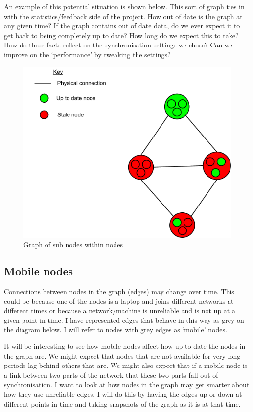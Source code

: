 \documentclass[12pt]{article}
\begin{document}
An example of this potential situation is shown below.
This sort of graph ties in with the statistics/feedback side of the
project. How out of date is the graph at any given time?
If the graph contains out of date data, do we ever expect it
to get back  to being completely up to date? How long do we expect
this to take? How do these facts reflect on the synchronisation settings
we chose? Can we improve on the ‘performance’ by tweaking the settings?

\begin{figure}[htp]
    \centering
    \includegraphics[scale=0.5]{images/sub-node.png}
    \caption{Graph of sub nodes within nodes}
    \label{fig:sub_node}
\end{figure}

\newpage
\subsection{Mobile nodes}

Connections between nodes in the graph (edges) may
change over time. This could be because one of the nodes
is a laptop and joins different networks at different
times or because a network/machine is unreliable and is
not up at a given point in time. I have represented
edges that behave in this way as grey on the diagram below.
I will refer to nodes with grey edges as `mobile' nodes.

It will be interesting to see how mobile nodes affect how
up to date the nodes in the graph are. We might expect that
nodes that are not available for very long periods lag behind
others that are. We might also expect that if a mobile
node is a link between two parts of the network that
these two parts fall out of synchronisation. I want to look
at how nodes in the graph may get smarter about how
they use unreliable edges. I will do this by having
the edges up or down at different points in time
and taking snapshots of the graph as it is at that time.
\end{document}
